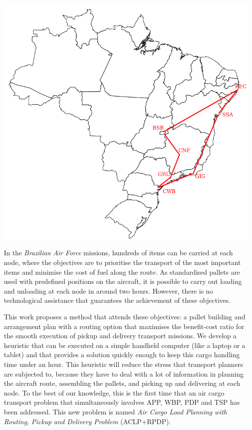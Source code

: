 \documentclass[preprint,authoryear]{elsarticle}
\begin{document}
\begin{table}[H]
\begin{minipage}{0.45\linewidth}
	\end{minipage}\hfill %
	\begin{minipage}{0.50\linewidth}
		\centering
		\includegraphics[scale=0.25]{Images/nodes.png}
		\label{fig:nodes}		
	\end{minipage}
\end{table}


In the {\it Brazilian Air Force}\/ missions, hundreds of items can be carried at each node, where the objectives are to prioritise the transport of the most important items and minimise the cost of fuel along the route. As standardised pallets are used with predefined positions on the aircraft, it is possible to carry out loading and unloading at each node in around two hours. However, there is no technological assistance that guarantees the achievement of these objectives.

This work proposes a method that attends these objectives: a pallet building and arrangement plan with a routing option that maximises the benefit-cost ratio for the smooth execution of pickup and delivery transport missions. We develop a heuristic that can be executed on a simple handheld computer (like a laptop or a tablet) and that provides a solution quickly enough to keep this cargo handling time under an hour. This heuristic will reduce the stress that transport planners are subjected to, because they have to deal with a lot of information in planning the aircraft route, assembling the pallets, and picking up and delivering at each node. To the best of our knowledge, this is the first time that an air cargo transport problem that simultaneously involves APP, WBP, PDP and TSP has been addressed. This new problem is named {\it Air Cargo Load Planning with Routing, Pickup and Delivery Problem} (ACLP+RPDP).
\end{document}
